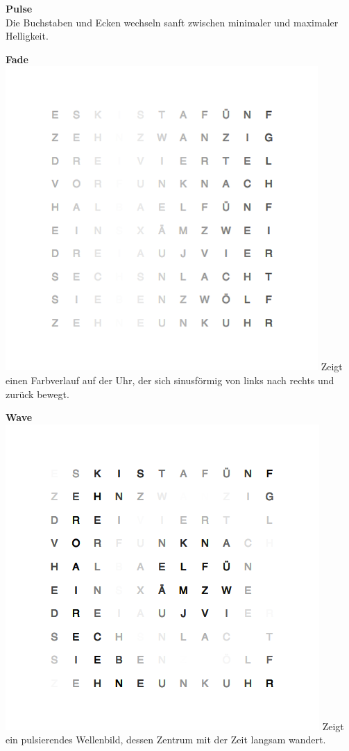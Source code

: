 \begin{multicols}{2}
\textbf{Pulse} \\
Die Buchstaben und Ecken wechseln sanft zwischen minimaler und maximaler Helligkeit.

\textbf{Fade} \\
\includegraphics[width=\columnwidth]{Abbildungen/Software/Demo/Fade}
Zeigt einen Farbverlauf auf der Uhr, der sich sinusförmig von links nach rechts und zurück bewegt.

\textbf{Wave} \\
\includegraphics[width=\columnwidth]{Abbildungen/Software/Demo/Welle}
Zeigt ein pulsierendes Wellenbild, dessen Zentrum mit der Zeit langsam wandert.


\end{multicols}
